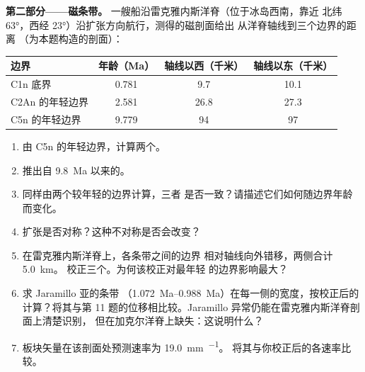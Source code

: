 \begin{problem}
\noindent\textbf{第二部分——磁条带。}
一艘船沿雷克雅内斯洋脊（位于冰岛西南，靠近
北纬 \ang{63}，西经 \ang{23}）沿扩张方向航行，测得的磁剖面给出
从洋脊轴线到三个边界的距离
（为本题构造的剖面）：
\begin{center}\small
\begin{tabular}{lccc}
\hline
边界 & 年龄（Ma） & 轴线以西（千米） & 轴线以东（千米）\\
\hline
C1n 底界 & 0.781 & 9.7 & 10.1\\
C2An 的年轻边界 & 2.581 & 26.8 & 27.3\\
C5n 的年轻边界 & 9.779 & 94 & 97\\
\hline
\end{tabular}
\end{center}
\begin{enumerate}[resume]
  \item 由 C5n 的年轻边界，计算两个。
  \item 推出自 \qty{9.8}{Ma} 以来的。
  \item 同样由两个较年轻的边界计算，三者
        是否一致？请描述它们如何随边界年龄而变化。
  \item 扩张是否对称？这种不对称是否会改变？
  \item 在雷克雅内斯洋脊上，各条带之间的边界
        相对轴线向外错移，两侧合计 \qty{5.0}{km}。
        校正三个。为何该校正对最年轻
        的边界影响最大？
  \item 求 Jaramillo 亚的条带
        （\qtyrange{1.072}{0.988}{Ma}）在每一侧的宽度，按校正后的计算？将其与第 11 题的位移相比较。Jaramillo
        异常仍能在雷克雅内斯洋脊剖面上清楚识别，
        但在加克尔洋脊上缺失：这说明什么？
  \item 板块矢量在该剖面处预测速率为 \qty{19.0}{mm.^{-1}}。
        将其与你校正后的各速率比较。
\end{enumerate}


\end{problem}
